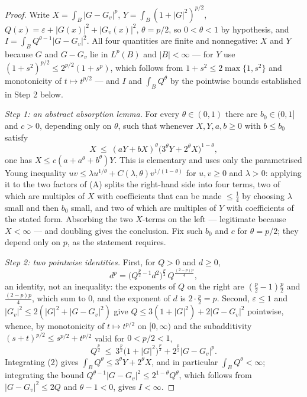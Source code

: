 \begin{proof}
Write $X=\int_B|G-G_v|^p$, $Y=\int_B(1+|G|^2)^{p/2}$,
$Q(x)=\varepsilon+|G(x)|^2+|G_v(x)|^2$, $\theta=p/2$, so $0<\theta<1$ by
hypothesis, and $I=\int_BQ^{\theta-1}|G-G_v|^2$.  All four quantities are
finite and nonnegative: $X$ and $Y$ because $G$ and $G-G_v$ lie in $L^p(B)$ and
$|B|<\infty$ --- for $Y$ use $(1+s^2)^{p/2}\le2^{p/2}(1+s^p)$, which follows
from $1+s^2\le2\max\{1,s^2\}$ and monotonicity of $t\mapsto t^{p/2}$ --- and
$I$ and $\int_BQ^\theta$ by the pointwise bounds established in Step 2 below.

\emph{Step 1: an abstract absorption lemma.}  For every $\theta\in(0,1)$ there
are $b_0\in(0,1]$ and $c>0$, depending only on $\theta$, such that whenever
$X,Y,a,b\ge0$ with $b\le b_0$ satisfy
\[
X\ \le\ (aY+bX)^{\theta}\bigl(3^{\theta}Y+2^{\theta}X\bigr)^{1-\theta},
\tag{A}
\]
one has $X\le c(a+a^{\theta}+b^{\theta})Y$.  This is elementary and uses only
the parametrised Young inequality $uv\le\lambda u^{1/\theta}+C(\lambda,\theta)v^{1/(1-\theta)}$
for $u,v\ge0$ and $\lambda>0$: applying it to the two factors of (A) splits the
right-hand side into four terms, two of which are multiples of $X$ with
coefficients that can be made $\le\tfrac14$ by choosing $\lambda$ small and
then $b_0$ small, and two of which are multiples of $Y$ with coefficients of
the stated form.  Absorbing the two $X$-terms on the left --- legitimate
because $X<\infty$ --- and doubling gives the conclusion.  Fix such $b_0$ and
$c$ for $\theta=p/2$; they depend only on $p$, as the statement requires.

\emph{Step 2: two pointwise identities.}  First, for $Q>0$ and $d\ge0$,
\[
d^{p}=\bigl(Q^{\frac p2-1}d^{2}\bigr)^{\frac p2}\,Q^{\frac{(2-p)p}{4}} ,
\tag{1}
\]
an identity, not an inequality: the exponents of $Q$ on the right are
$(\tfrac p2-1)\tfrac p2$ and $\tfrac{(2-p)p}{4}$, which sum to $0$, and the
exponent of $d$ is $2\cdot\tfrac p2=p$.  Second, $\varepsilon\le1$ and
$|G_v|^2\le2(|G|^2+|G-G_v|^2)$ give $Q\le3(1+|G|^2)+2|G-G_v|^2$ pointwise,
whence, by monotonicity of $t\mapsto t^{p/2}$ on $[0,\infty)$ and the
subadditivity $(s+t)^{p/2}\le s^{p/2}+t^{p/2}$ valid for $0<p/2<1$,
\[
Q^{\frac p2}\ \le\ 3^{\frac p2}\bigl(1+|G|^2\bigr)^{\frac p2}
  +2^{\frac p2}|G-G_v|^{p} .
\tag{2}
\]
Integrating (2) gives $\int_BQ^{\theta}\le3^{\theta}Y+2^{\theta}X$, and in
particular $\int_BQ^{\theta}<\infty$; integrating the bound
$Q^{\theta-1}|G-G_v|^2\le2^{1-\theta}Q^{\theta}$, which follows from
$|G-G_v|^2\le2Q$ and $\theta-1<0$, gives $I<\infty$.


\end{proof}
